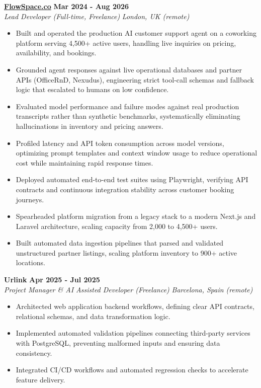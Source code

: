 \documentclass[10pt,a4paper]{article}
\newcommand{\role}[4]{%
  \textbf{#1} \hfill \textbf{#2}\\[1pt]%
  \textit{#3} \hfill \textit{#4}\\[2pt]%
}
\begin{document}
\role{\href{https://flowspace.co}{FlowSpace.co}}{Mar 2024 - Aug 2026}{Lead Developer (Full-time, Freelance)}{London, UK (remote)}
\begin{itemize}
  \item Built and operated the production AI customer support agent on a coworking platform serving 4,500+ active users, handling live inquiries on pricing, availability, and bookings.
  \item Grounded agent responses against live operational databases and partner APIs (OfficeRnD, Nexudus), engineering strict tool-call schemas and fallback logic that escalated to humans on low confidence.
  \item Evaluated model performance and failure modes against real production transcripts rather than synthetic benchmarks, systematically eliminating hallucinations in inventory and pricing answers.
  \item Profiled latency and API token consumption across model versions, optimizing prompt templates and context window usage to reduce operational cost while maintaining rapid response times.
  \item Deployed automated end-to-end test suites using Playwright, verifying API contracts and continuous integration stability across customer booking journeys.
  \item Spearheaded platform migration from a legacy stack to a modern Next.js and Laravel architecture, scaling capacity from 2,000 to 4,500+ users.
  \item Built automated data ingestion pipelines that parsed and validated unstructured partner listings, scaling platform inventory to 900+ active locations.
\end{itemize}

\role{Urlink}{Apr 2025 - Jul 2025}{Project Manager \& AI Assisted Developer (Freelance)}{Barcelona, Spain (remote)}
\begin{itemize}
  \item Architected web application backend workflows, defining clear API contracts, relational schemas, and data transformation logic.
  \item Implemented automated validation pipelines connecting third-party services with PostgreSQL, preventing malformed inputs and ensuring data consistency.
  \item Integrated CI/CD workflows and automated regression checks to accelerate feature delivery.
\end{itemize}
\end{document}
